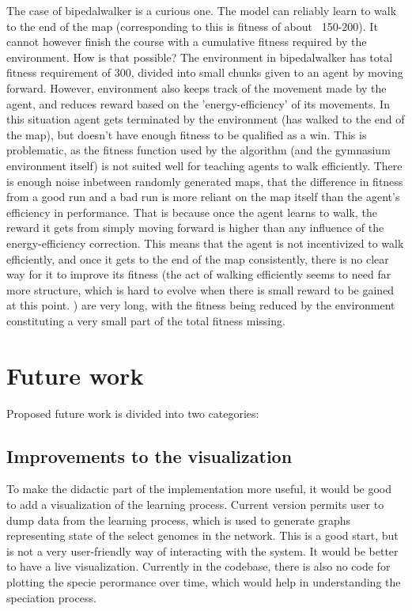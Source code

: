 \documentclass{article}
\begin{document}
    The case of bipedalwalker is a curious one. The model can reliably learn to walk to the end of the map (corresponding
    to this is fitness of about ~150-200). It cannot however finish the course with a cumulative fitness required by the
    environment. How is that possible? The environment in bipedalwalker has total fitness requirement of 300, divided
    into small chunks given to an agent by moving forward. However, environment also keeps track of the movement made
    by the agent, and reduces reward based on the 'energy-efficiency' of its movements. In this situation agent 
    gets terminated by the environment (has walked to the end of the map), but doesn't have enough fitness to be 
    qualified as a win. 
    This is problematic, as the fitness function used by the algorithm (and the gymnasium environment
    itself) is not suited well for teaching agents to walk efficiently. There is enough noise inbetween
    randomly generated maps, that the difference in fitness from a good run and a bad run is more reliant
    on the map itself than the agent's efficiency in performance.
     That is because once the agent learns to walk, the reward it gets from simply moving forward is higher than any influence
     of the energy-efficiency correction. This means that the agent is not incentivized to walk efficiently, and
     once it gets to the end of the map consistently, there is no clear way for it to improve its fitness (the 
     act of walking efficiently seems to need far more structure, which is hard to evolve when there is small 
     reward to be gained at this point.
      )
    are very long, with the fitness being reduced by the environment constituting a very small part of the total fitness missing.
\section{Future work}
    Proposed future work is divided into two categories: 
        \subsection{Improvements to the visualization} 
        To make the didactic part of the implementation more useful, it would be good to add a visualization of the
        learning process. Current version permits user to dump data from the learning process, which is used to
        generate graphs representing state of the select genomes in the network. This is a good start, but is not
        a very user-friendly way of interacting with the system. It would be better to have a live visualization.
        Currently in the codebase, there is also no code for plotting the specie perormance over time, which would
        help in understanding the speciation process.
\end{document}
